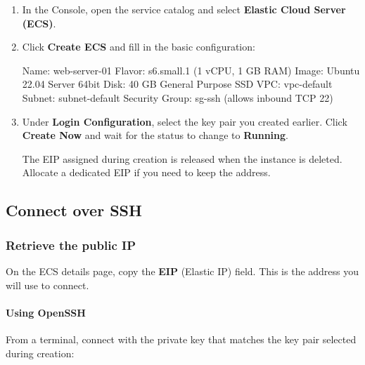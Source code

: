 \documentclass[english]{guide}
\begin{document}
\passoapasso
\begin{enumerate}
  \item In the Console, open the service catalog and select
        \textbf{Elastic Cloud Server (ECS)}.


  \item Click \textbf{Create ECS} and fill in the basic configuration:

  \begin{codigo}
Name:           web-server-01
Flavor:         s6.small.1 (1 vCPU, 1 GB RAM)
Image:          Ubuntu 22.04 Server 64bit
Disk:           40 GB General Purpose SSD
VPC:            vpc-default
Subnet:         subnet-default
Security Group: sg-ssh (allows inbound TCP 22)
  \end{codigo}

  \item Under \textbf{Login Configuration}, select the key pair you created
        earlier. Click \textbf{Create Now} and wait for the status to change
        to \textbf{Running}.



  \begin{aviso}
  The EIP assigned during creation is released when the instance is deleted.
  Allocate a dedicated EIP if you need to keep the address.
  \end{aviso}
\end{enumerate}

\subsection{Connect over SSH}

\subsubsection{Retrieve the public IP}

On the ECS details page, copy the \textbf{EIP} (Elastic IP) field. This is
the address you will use to connect.

\paragraph{Using OpenSSH}
From a terminal, connect with the private key that matches the key pair
selected during creation:
\end{document}
